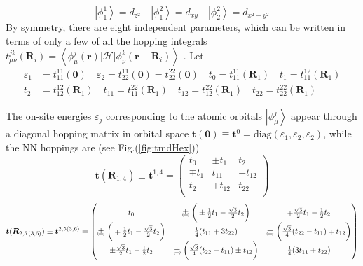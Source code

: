 \begin{equation*}
\left| \phi_1^1 \right\rangle = d_{z^2} \quad \left| \phi_1^2 \right\rangle = d_{xy} \quad \left| \phi_2^2 \right\rangle = d_{x^2 - y^2} 
\end{equation*}
By symmetry, there are eight independent parameters, which can be written in terms of only a few of all the hopping integrals $t_{\mu \nu}^{j k} ( \bm R_i ) = \left\langle \phi_\mu^j ( \bm r ) | \mathcal{H} | \phi_{\nu}^k ( \bm r - \bm R_i ) \right\rangle$ \cite{braz_electronic_2015,liu_three-band_2013}.
Let 
\begin{equation*}
\begin{split}
\varepsilon_1 &= t_{11}^{11} ( \bm 0 ) \quad \varepsilon_2 = t_{22}^{11} ( \bm 0 ) = t_{22}^{22} ( \bm 0 ) \quad t_0 = t_{11}^{11} ( \bm R_1 ) \quad t_1 = t_{11}^{12} ( \bm R_1 ) \\
t_2 &= t_{12}^{12} ( \bm R_1 ) \quad t_{11} = t_{11}^{22} ( \bm R_1 ) \quad t_{12} = t_{12}^{22} ( \bm R_1 ) \quad t_{22} = t_{22}^{22} ( \bm R_1 )
\end{split}
\end{equation*}

The on-site energies $\varepsilon_j$ corresponding to the atomic orbitals $\left| \phi_\mu^j \right\rangle$ appear through a diagonal hopping matrix in orbital space $\bm t ( \bm 0 ) \equiv \bm t^0 = \text{diag} ( \varepsilon_1, \varepsilon_2, \varepsilon_2 )$, while the NN hoppings are (see Fig.(\ref{fig:tmdHex}))
\begin{equation}
\bm t (\bm R_{1, 4}) \equiv \bm t^{1, 4} =
\begin{pmatrix}
t_0 & \pm t_1 & t_2 \\
\mp t_1 & t_{11} & \pm t_{12} \\
t_2 & \mp t_{12} & t_{22} \\
\end{pmatrix}
\end{equation}
\begin{equation}
\bm t (\bm R_{2,5\,(3,6)})  \equiv \bm t^{2, 5 (3, 6)}  =
\begin{pmatrix}
t_0 & \Pm \bigg( \pm \frac{1}{2} t_1 - \frac{\sqrt{3}}{2} t_2 \bigg) & \mp \frac{\sqrt{3}}{2} t_1 - \frac{1}{2} t_2 \\
\Pm \bigg( \mp \frac{1}{2} t_1 - \frac{\sqrt{3}}{2} t_2 \bigg) & \frac{1}{4} ( t_{11} + 3 t_{22} ) & \Pm \bigg( \frac{\sqrt{3}}{4} ( t_{22} - t_{11} ) \mp t_{12} \bigg) \\
\pm \frac{\sqrt{3}}{2} t_1 - \frac{1}{2} t_2 & \Pm \bigg( \frac{\sqrt{3}}{4} ( t_{22} - t_{11} ) \pm t_{12} \bigg) & \frac{1}{4} ( 3 t_{11} + t_{22} )
\end{pmatrix}
\end{equation}


